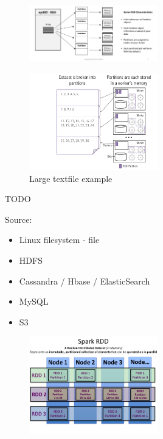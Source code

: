 \documentclass{article}
\begin{document}
\begin{figure}[H]
    \centering
    \includegraphics[width=0.5\textwidth]{rdd2.png}
    \caption{}
\end{figure}


\begin{figure}[H]
    \centering
    \includegraphics[width=0.5\textwidth]{rdd.png}
    \caption{Large textfile example}
\end{figure}


TODO

Source:

\begin{itemize}
    \item Linux filesystem - file
    \item HDFS
    \item Cassandra / Hbase / ElasticSearch
    \item MySQL
    \item S3
\end{itemize}

\begin{figure}[H]
    \centering
    \includegraphics[width=0.5\textwidth]{spark-rdd.png}
    \caption{}
\end{figure}
\end{document}
